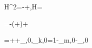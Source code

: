 H^2=\rho-+,\qquad H=

=-\left(\rho+\right)+

=++\Omega_{\Lambda,0},\qquad \Omega_{k,0}=1-\Omega_{m,0}-\Omega_{\Lambda,0}
